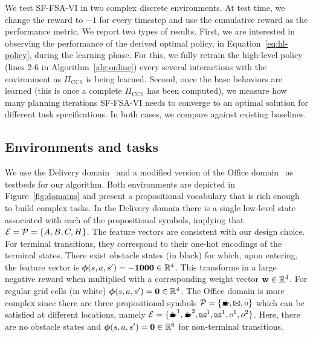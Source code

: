 We test SF-FSA-VI in two complex discrete environments. At test time, we change the reward to $-1$ for every timestep and use the cumulative reward as the performance metric. We report two types of results. First, we are interested in observing the performance of the derived optimal policy, in Equation~\eqref{eq:hl-policy}, during the learning phase. For this, we fully retrain the high-level policy (lines 2-6 in Algorithm~\ref{alg:online}) every several interactions with the environment as $\Pi_\text{CCS}$ is being learned. Second, once the base behaviors are learned (this is once a complete $\Pi_\text{CCS}$ has been computed), we measure how many planning iterations SF-FSA-VI needs to converge to an optimal solution for different task specifications. In both cases, we compare against existing baselines.

\subsection{Environments and tasks} We use the Delivery domain~\citep{Araki2021} and a modified version of the Office domain~\citep{Icarte2022} as testbeds for our algorithm. Both environments are depicted in Figure~\ref{fig:domains} and present a propositional vocabulary that is rich enough to build complex tasks. In the Delivery domain there is a single low-level state associated with each of the propositional symbols, implying that ${\mathcal{E}=\mathcal{P}=\{A,B,C, H\}}$. The feature vectors are consistent with our design choice. For terminal transitions, they correspond to their one-hot encodings of the terminal states. There exist obstacle states (in black) for which, upon entering,  the feature vector is $\boldsymbol{\phi}(s,a,s')=\mathbf{-1000}\in\mathbb{R}^4$. This transforms in a large negative reward when multiplied with a corresponding weight vector $\mathbf{w}\in\mathbb{R}^{4}$. For regular grid cells (in white) $\boldsymbol{\phi}(s,a,s')=\mathbf{0}\in\mathbb{R}^{4}$. The Office domain is more complex since there are three propositional symbols $\cP=\{\text{\coffee}, \text{\mail}, o\}$ which can be satisfied at different locations, namely $\cE=\{\text{\coffee}^1, \text{\coffee}^2, \text{\mail}^1, \text{\mail}^1, o^1, o^2\}$. Here, there are no obstacle states and $\boldsymbol{\phi}(s,a,s')=\mathbf{0}\in\mathbb{R}^6$ for non-terminal transitions.

